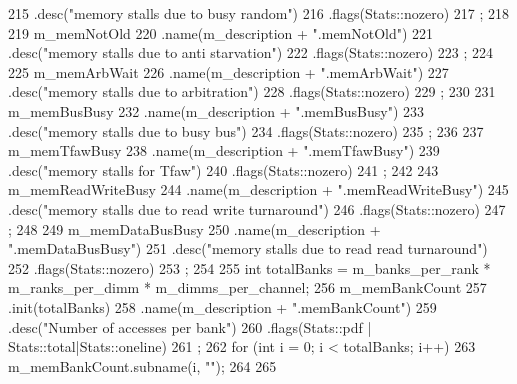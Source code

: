 \begin{DoxyCode}
{215         .desc("memory stalls due to busy random")
216         .flags(Stats::nozero)
217         ;
218 
219     m_memNotOld
220         .name(m_description + ".memNotOld")
221         .desc("memory stalls due to anti starvation")
222         .flags(Stats::nozero)
223         ;
224 
225     m_memArbWait
226         .name(m_description + ".memArbWait")
227         .desc("memory stalls due to arbitration")
228         .flags(Stats::nozero)
229         ;
230 
231     m_memBusBusy
232         .name(m_description + ".memBusBusy")
233         .desc("memory stalls due to busy bus")
234         .flags(Stats::nozero)
235         ;
236 
237     m_memTfawBusy
238         .name(m_description + ".memTfawBusy")
239         .desc("memory stalls for Tfaw")
240         .flags(Stats::nozero)
241         ;
242 
243     m_memReadWriteBusy
244         .name(m_description + ".memReadWriteBusy")
245         .desc("memory stalls due to read write turnaround")
246         .flags(Stats::nozero)
247         ;
248 
249     m_memDataBusBusy
250         .name(m_description + ".memDataBusBusy")
251         .desc("memory stalls due to read read turnaround")
252         .flags(Stats::nozero)
253         ;
254 
255     int totalBanks = m_banks_per_rank * m_ranks_per_dimm * m_dimms_per_channel;
256     m_memBankCount
257         .init(totalBanks)
258         .name(m_description + ".memBankCount")
259         .desc("Number of accesses per bank")
260         .flags(Stats::pdf | Stats::total|Stats::oneline)
261         ;
262     for (int i = 0; i < totalBanks; i++) {
263         m_memBankCount.subname(i, "");
264     }
265 }
\end{DoxyCode}


